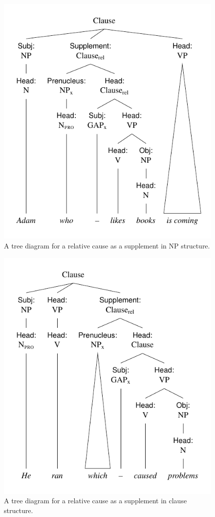 \begin{figure}[ht]
    \centering
    \includegraphics{figures/adam-who-likes-books.pdf}
    \caption{A tree diagram for a relative cause as a supplement in NP structure.}
    \label{fig:a-guy-who-likes}
\end{figure}

\begin{figure}[ht]
    \centering
    \includegraphics{figures/he-ran-which-caused-problems.pdf}
    \caption{A tree diagram for a relative cause as a supplement in clause structure.}
    \label{fig:he-ran-which}
\end{figure}

